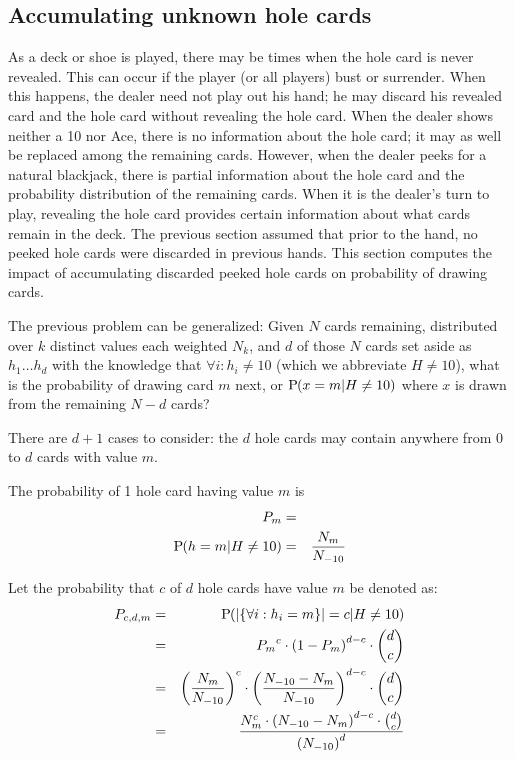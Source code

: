 \subsection{Accumulating unknown hole cards}
\label{sec:basic:peeking:accumulate}

As a deck or shoe is played, there may be times when the hole card
is never revealed.  This can occur if the player (or all players)
bust or surrender. 
When this happens, the dealer need not play out his hand; 
he may discard his revealed card and the hole card without revealing
the hole card.
When the dealer shows neither a 10 nor Ace, 
there is no information about the hole card;
it may as well be replaced among the remaining cards.  
However, when the dealer peeks for a natural blackjack,
there is partial information about the hole card
and the probability distribution of the remaining cards.  
When it is the dealer's turn to play, 
revealing the hole card provides certain information about 
what cards remain in the deck.  
The previous section assumed that prior to the hand, 
no peeked hole cards were discarded in previous hands.
This section computes the impact of accumulating discarded peeked hole cards
on probability of drawing cards.  

The previous problem can be generalized:
Given $N$ cards remaining, distributed over $k$ distinct values 
each weighted $N_k$, and $d$ of those $N$ cards 
set aside as $h_1\ldots{}h_d$
with the knowledge that $\forall{}i:h_i\neq{}10$
(which we abbreviate $H\neq{}10$), 
what is the probability of drawing card $m$ next, 
or $\textrm{P}\hspace{-.5ex}\left(x=m|H\neq{}10\right)$ where $x$ is drawn from the 
remaining $N-d$ cards?

There are $d+1$ cases to consider:
the $d$ hole cards may contain anywhere from $0$ to $d$ cards with value $m$.

The probability of 1 hole card having value $m$ is
\begin{eqnarray}
P_m &=& \nonumber \\
\textrm{P}\hspace{-.5ex}\left(h=m|H\neq{}10\right) &=& \frac{N_m}{N_{-10}}
\end{eqnarray}

Let the probability that $c$ of $d$ hole cards have value $m$ be denoted as:
\begin{eqnarray}
P_{c,d,m} &=& \textrm{P}\hspace{-.5ex}\left(\left|\left\{\forall{}i:h_i=m\right\}\right|=c|H\neq{}10\right) \\
&=& {P_m}^c \cdot \left(1-P_m\right)^{d-c} \cdot\binom{d}{c} \\
&=& \left(\frac{N_m}{N_{-10}}\right)^c\cdot\left(\frac{N_{-10}-N_m}{N_{-10}}\right)^{d-c} \cdot\binom{d}{c} \\
&=& \frac{N_m^c\cdot\left(N_{-10}-N_m\right)^{d-c}\cdot\binom{d}{c}}{\left(N_{-10}\right)^d}
\end{eqnarray}

